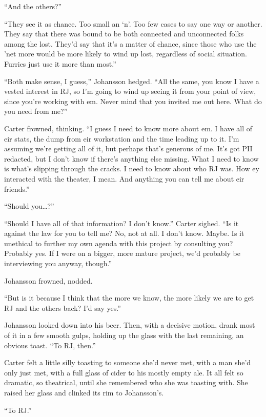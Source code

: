 ``And the others?''

``They see it as chance. Too small an `n'. Too few cases to say one way or another. They say that there was bound to be both connected and unconnected folks among the lost. They'd say that it's a matter of chance, since those who use the 'net more would be more likely to wind up lost, regardless of social situation. Furries just use it more than most.''

``Both make sense, I guess,'' Johansson hedged. ``All the same, you know I have a vested interest in RJ, so I'm going to wind up seeing it from your point of view, since you're working with em. Never mind that you invited me out here. What do you need from me?''

Carter frowned, thinking. ``I guess I need to know more about em. I have all of eir stats, the dump from eir workstation and the time leading up to it. I'm assuming we're getting all of it, but perhaps that's generous of me. It's got PII redacted, but I don't know if there's anything else missing. What I need to know is what's slipping through the cracks. I need to know about who RJ was. How ey interacted with the theater, I mean. And anything you can tell me about eir friends.''

``Should you\ldots{}?''

``Should I have all of that information? I don't know.'' Carter sighed. ``Is it against the law for you to tell me? No, not at all. I don't know. Maybe. Is it unethical to further my own agenda with this project by consulting you? Probably yes. If I were on a bigger, more mature project, we'd probably be interviewing you anyway, though.''

Johansson frowned, nodded.

``But is it because I think that the more we know, the more likely we are to get RJ and the others back? I'd say yes.''

Johansson looked down into his beer. Then, with a decisive motion, drank most of it in a few smooth gulps, holding up the glass with the last remaining, an obvious toast. ``To RJ, then.''

Carter felt a little silly toasting to someone she'd never met, with a man she'd only just met, with a full glass of cider to his mostly empty ale. It all felt so dramatic, so theatrical, until she remembered who she was toasting with. She raised her glass and clinked its rim to Johansson's.

``To RJ.''
